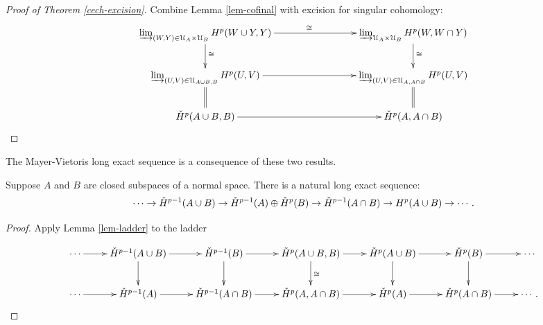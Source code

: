 \begin{proof}[Proof of Theorem \ref{cech-excision}]
Combine Lemma \ref{lem-cofinal} with excision for singular cohomology:
\begin{equation*}
\xymatrix{
\varinjlim_{(W,Y)\in\mathcal{U}_A\times\mathcal{U}_B}H^p(W\cup Y,Y)
\ar[rrr]^{\cong}\ar[d]^{\cong} & & & 
\varinjlim_{\mathcal{U}_A\times\mathcal{U}_B}H^p(W,W\cap Y)\ar[d]^{\cong}\\
\varinjlim_{(U,V)\in\mathcal{U}_{A\cup B,B}}H^p(U,V)\ar[rrr]\ar@{=}[d] & & & \varinjlim_{(U,V)\in\mathcal{U}_{A,A\cap B}}H^p(U,V)\ar@{=}[d]\\
	\cHH^p(A\cup B,B)\ar[rrr] & & & \cHH^p(A,A\cap B)
}\end{equation*}
\end{proof}
The Mayer-Vietoris long exact sequence is a consequence of these two
results.
\begin{corollary} 
\label{thm-mayer-vietoris-ladder}
Suppose $A$ and $B$ are closed subspaces of a 
normal space. There is a natural long exact sequence: 
\[
\cdots\to\check{H}^{p-1}(A\cup B)\to\check{H}^{p-1}(A)\oplus\check{H}^p(B)\to
\check{H}^{p-1}(A\cap B)\to H^p(A\cup B)\to\cdots\,.
\]
\end{corollary}
\begin{proof}
Apply Lemma \ref{lem-ladder} to the ladder

\[
\xymatrix{
\cdots \ar[r] & \cHH^{p-1}(A\cup B) \ar[d] \ar[r] & 
\cHH^{p-1}(B) \ar[d] \ar[r] & \cHH^p(A\cup B,B) \ar[d]^\cong \ar[r] &
\cHH^p(A\cup B) \ar[d] \ar[r] & \cHH^p(B) \ar[d] \ar[r] & \cdots \\
\cdots \ar[r] & \cHH^{p-1}(A) \ar[r] & \cHH^{p-1}(A\cap B) \ar[r] & 
\cHH^p(A,A\cap B) \ar[r] & \cHH^p(A) \ar[r] & \cHH^p(A\cap B) \ar[r] & \cdots
\,.
}\]
\end{proof}
